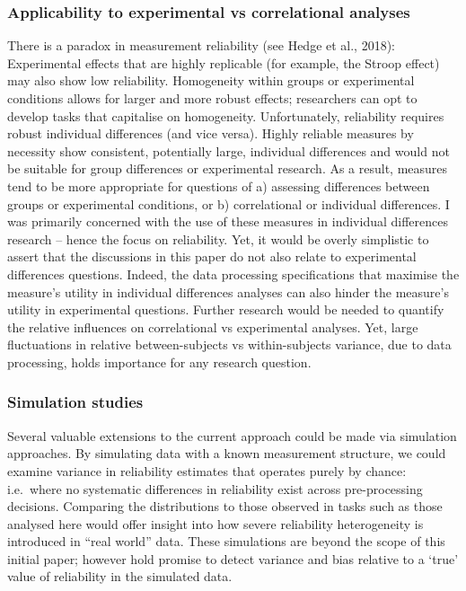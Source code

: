 \documentclass[
  man,floatsintext]{apa6}
\begin{document}
\hypertarget{applicability-to-experimental-vs-correlational-analyses}{%
\subsubsection{Applicability to experimental vs correlational analyses}\label{applicability-to-experimental-vs-correlational-analyses}}

There is a paradox in measurement reliability (see Hedge et al., 2018): Experimental effects that are highly replicable (for example, the Stroop effect) may also show low reliability. Homogeneity within groups or experimental conditions allows for larger and more robust effects; researchers can opt to develop tasks that capitalise on homogeneity. Unfortunately, reliability requires robust individual differences (and vice versa). Highly reliable measures by necessity show consistent, potentially large, individual differences and would not be suitable for group differences or experimental research. As a result, measures tend to be more appropriate for questions of a) assessing differences between groups or experimental conditions, or b) correlational or individual differences. I was primarily concerned with the use of these measures in individual differences research -- hence the focus on reliability. Yet, it would be overly simplistic to assert that the discussions in this paper do not also relate to experimental differences questions. Indeed, the data processing specifications that maximise the measure's utility in individual differences analyses can also hinder the measure's utility in experimental questions. Further research would be needed to quantify the relative influences on correlational vs experimental analyses. Yet, large fluctuations in relative between-subjects vs within-subjects variance, due to data processing, holds importance for any research question.

\hypertarget{simulation-studies}{%
\subsubsection{Simulation studies}\label{simulation-studies}}

Several valuable extensions to the current approach could be made via simulation approaches. By simulating data with a known measurement structure, we could examine variance in reliability estimates that operates purely by chance: i.e.~where no systematic differences in reliability exist across pre-processing decisions. Comparing the distributions to those observed in tasks such as those analysed here would offer insight into how severe reliability heterogeneity is introduced in ``real world'' data. These simulations are beyond the scope of this initial paper; however hold promise to detect variance and bias relative to a `true' value of reliability in the simulated data.
\end{document}
